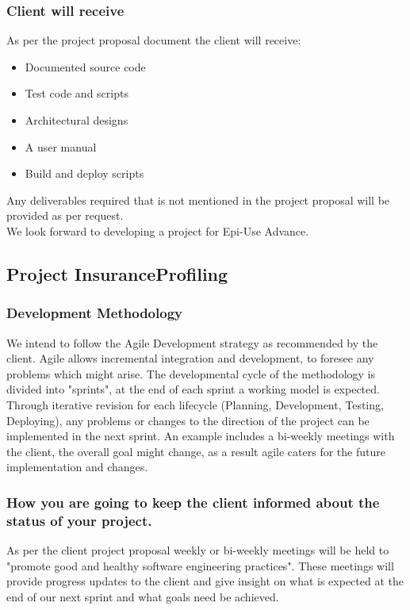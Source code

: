 \documentclass{article}
\begin{document}
	\subsubsection{Client will receive}
	As per the project proposal document the client will receive:
	\begin{itemize}
		\item Documented source code
		\item Test code and scripts
		\item Architectural designs
		\item A user manual
		\item Build and deploy scripts
	\end{itemize}
	Any deliverables required that is not mentioned in the project proposal will be provided as per request.\\
	
	We look forward to developing a project for Epi-Use Advance.
	
	
	\subsection{Project InsuranceProfiling}
	\subsubsection{Development Methodology}
	We intend to follow the Agile Development strategy as recommended by the client. Agile allows incremental integration and development, to foresee any problems which might arise. The developmental cycle of the methodology is divided into "sprints", at the end of each sprint a working model is expected. Through iterative revision for each lifecycle (Planning, Development, Testing, Deploying), any problems or changes to the direction of the project can be implemented in the next sprint. An example includes a bi-weekly meetings with the client, the overall goal might change, as a result agile caters for the future implementation and changes.
	
	\subsubsection{How you are going to keep the client informed about the status of your project.}
	As per the client project proposal weekly or bi-weekly meetings will be held to "promote good and
healthy software engineering practices". These meetings will provide progress updates to the client and give insight on what is expected at the end of our next sprint and what goals need be achieved. 
	
\end{document}
